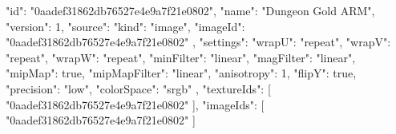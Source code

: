 {
  "id": "0aadef31862db76527e4e9a7f21e0802",
  "name": "Dungeon Gold ARM",
  "version": 1,
  "source": {
    "kind": "image",
    "imageId": "0aadef31862db76527e4e9a7f21e0802"
  },
  "settings": {
    "wrapU": "repeat",
    "wrapV": "repeat",
    "wrapW": "repeat",
    "minFilter": "linear",
    "magFilter": "linear",
    "mipMap": true,
    "mipMapFilter": "linear",
    "anisotropy": 1,
    "flipY": true,
    "precision": "low",
    "colorSpace": "srgb"
  },
  "textureIds": [
    "0aadef31862db76527e4e9a7f21e0802"
  ],
  "imageIds": [
    "0aadef31862db76527e4e9a7f21e0802"
  ]
}
